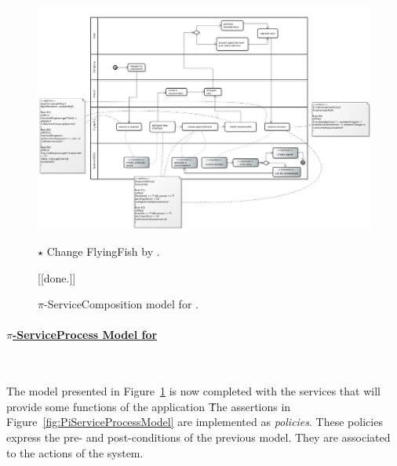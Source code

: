\begin{figure}[t]
\centering
\includegraphics[width=1.0\textwidth]{figs/ServiceCompositionGeneralCut}
{\color{red} \raggedright
$\star$ Change FlyingFish by \FlyingPig.
} {\color{blue} [[done.]]}
\caption{$\pi$-ServiceComposition model for \FlyingPig.\label{fig:PiServiceCompositionModel}}
\end{figure}

\paragraph{\underline{$\pi$-ServiceProcess Model for \FlyingPig}}~

The model presented in Figure~\ref{fig:PiServiceCompositionModel} 
is now  completed with the services that will provide some functions of the application  \FlyingPig\.
The assertions in Figure~\ref{fig:PiServiceProcessModel} are implemented as \textit{policies}.
These policies express the pre- and post-conditions of the previous model.
They are associated to the actions of the system.



